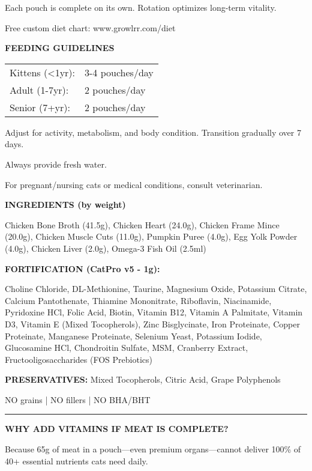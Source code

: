 \documentclass[10pt,a6paper,landscape]{article}
\begin{document}
\begin{multicols}{3}
{Each pouch is complete on its own. Rotation optimizes long-term vitality.

Free custom diet chart: www.growlrr.com/diet
}

\vspace{3mm}
{\small\bfseries FEEDING GUIDELINES}

{\tiny
\begin{tabular}{ll}
Kittens (<1yr): & 3-4 pouches/day \\
Adult (1-7yr): & 2 pouches/day \\
Senior (7+yr): & 2 pouches/day \\
\end{tabular}

Adjust for activity, metabolism, and body condition. Transition gradually over 7 days.

Always provide fresh water.

For pregnant/nursing cats or medical conditions, consult veterinarian.
}

\columnbreak

{\small\bfseries INGREDIENTS (by weight)}

{\tiny
Chicken Bone Broth (41.5g), Chicken Heart (24.0g), Chicken Frame Mince (20.0g), Chicken Muscle Cuts (11.0g), Pumpkin Puree (4.0g), Egg Yolk Powder (4.0g), Chicken Liver (2.0g), Omega-3 Fish Oil (2.5ml)

\textbf{FORTIFICATION (CatPro v5 - 1g):}

Choline Chloride, DL-Methionine, Taurine, Magnesium Oxide, Potassium Citrate, Calcium Pantothenate, Thiamine Mononitrate, Riboflavin, Niacinamide, Pyridoxine HCl, Folic Acid, Biotin, Vitamin B12, Vitamin A Palmitate, Vitamin D3, Vitamin E (Mixed Tocopherols), Zinc Bisglycinate, Iron Proteinate, Copper Proteinate, Manganese Proteinate, Selenium Yeast, Potassium Iodide, Glucosamine HCl, Chondroitin Sulfate, MSM, Cranberry Extract, Fructooligosaccharides (FOS Prebiotics)

\textbf{PRESERVATIVES:} Mixed Tocopherols, Citric Acid, Grape Polyphenols

NO grains | NO fillers | NO BHA/BHT
}

\vspace{3mm}
\hrule
\vspace{1mm}

{\small\bfseries WHY ADD VITAMINS IF MEAT IS COMPLETE?}

{\tiny
Because 65g of meat in a pouch---even premium organs---cannot deliver 100\% of 40+ essential nutrients cats need daily.

}
\end{multicols}
\end{document}
